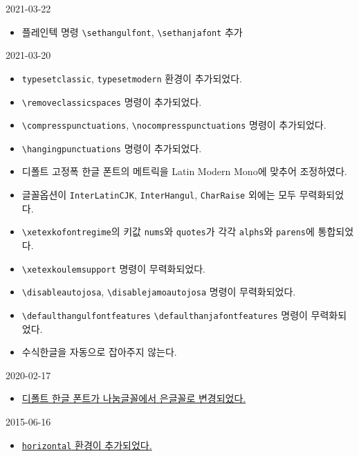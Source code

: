 \documentclass[a4paper]{article}
\def\cs#1{\texttt{\textbackslash #1}}
\begin{document}
\begin{small}\linespread{1.2}\selectfont
\begin{description}\itemsep=0pt
    \item[v3.1] 2021-03-22
      \begin{itemize}
        \item 플레인텍 명령 \cs{sethangulfont}, \cs{sethanjafont} 추가
      \end{itemize}
    \item[v3.0] 2021-03-20
      \begin{itemize}
        \item \verb|typesetclassic|, \verb|typesetmodern| 환경이 추가되었다.
        \item \cs{removeclassicspaces} 명령이 추가되었다.
        \item \cs{compresspunctuations}, \cs{nocompresspunctuations} 명령이 추가되었다.
        \item \cs{hangingpunctuations} 명령이 추가되었다.
        \item 디폴트 고정폭 한글 폰트의 메트릭을 Latin Modern Mono에
          맞추어 조정하였다.
        \item 글꼴옵션이 \verb|InterLatinCJK|, \verb|InterHangul|, \verb|CharRaise|
          외에는 모두 무력화되었다.
        \item \cs{xetexkofontregime}의 키값 \verb|nums|와 \verb|quotes|가
          각각 \verb|alphs|와 \verb|parens|에 통합되었다.
        \item \cs{xetexkoulemsupport} 명령이 무력화되었다.
        \item \cs{disableautojosa}, \cs{disablejamoautojosa} 명령이 무력화되었다.
        \item \cs{defaulthangulfontfeatures} \cs{defaulthanjafontfeatures}
          명령이 무력화되었다.
        \item 수식한글을 자동으로 잡아주지 않는다.
      \end{itemize}
    \item[v2.23] 2020-02-17
      \begin{itemize}
        \item \hyperref[sec:fontcmds]
          {디폴트 한글 폰트가 나눔글꼴에서 은글꼴로 변경되었다.}
      \end{itemize}
    \item[v2.13] 2015-06-16
      \begin{itemize}
        \item \hyperref[sec:verttype]
          {\texttt{horizontal} 환경이 추가되었다.}

\end{itemize}
\end{description}
\end{small}
\end{document}
